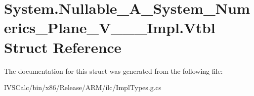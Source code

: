 \hypertarget{struct_system_1_1_nullable___a___system___numerics___plane___v_______impl_1_1_vtbl}{}\section{System.\+Nullable\+\_\+\+A\+\_\+\+System\+\_\+\+Numerics\+\_\+\+Plane\+\_\+\+V\+\_\+\+\_\+\+\_\+\+Impl.\+Vtbl Struct Reference}
\label{struct_system_1_1_nullable___a___system___numerics___plane___v_______impl_1_1_vtbl}


The documentation for this struct was generated from the following file\+:\begin{DoxyCompactItemize}
\item 
I\+V\+S\+Calc/bin/x86/\+Release/\+A\+R\+M/ilc/Impl\+Types.\+g.\+cs\end{DoxyCompactItemize}
